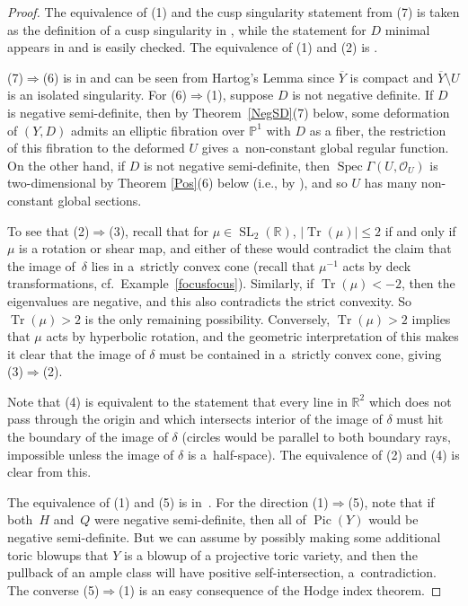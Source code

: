 \documentclass[11pt]{article}
\numberwithin{equation}{section}
\numberwithin{figure}{section}
\numberwithin{table}{section}
\DeclareMathOperator{\Pic}{Pic}
\DeclareMathOperator{\Spec}{Spec}
\DeclareMathOperator{\Tr}{Tr}
\DeclareMathOperator{\SL}{SL}
\let\?=\overline
\let\bb=\mathbb
\let\s=\mathcal
\theoremstyle{definition}
\begin{document}
\begin{proof}The equivalence of (1) and the cusp singularity statement from (7) is taken as the definition of a cusp singularity in \cite{GHK1}, while the statement for $D$ minimal appears in \cite[Example~1.10]{GHK1} and is easily checked. The equivalence of (1) and (2) is \cite[Lemma~1.5, arXiv v1]{GHK1}.

(7)$\Rightarrow$(6) is in \cite{GHK2} and can be seen from Hartog's Lemma since $\?{Y}$ is compact and $\?{Y}\setminus U$ is an isolated singularity. For (6)$\Rightarrow$(1), suppose $D$ is not negative definite. If $D$ is negative semi-definite, then by Theorem~\ref{NegSD}(7) below, some deformation of $(Y,D)$ admits an elliptic fibration over $\bb{P}^1$ with $D$ as a fiber, the restriction of this fibration to the deformed $U$ gives a~non-constant global regular function. On the other hand, if $D$ is not negative semi-definite, then $\Spec \Gamma(U,\s{O}_U)$ is two-dimensional by Theorem \ref{Pos}(6) below (i.e., by \cite[Lemma~6.9]{GHK1}), and so $U$ has many non-constant global sections.

To see that (2)$\Rightarrow$(3), recall that for $\mu \in \SL_2(\bb{R})$, $|\Tr(\mu)|\leq 2$ if and only if $\mu$ is a rotation or shear map, and either of these would contradict the claim that the image of~$\delta$ lies in a~strictly convex cone (recall that $\mu^{-1}$ acts by deck transformations, cf.\ Example~\ref{focusfocus}). Similarly, if \mbox{$\Tr(\mu)<-2$}, then the eigenvalues are negative, and this also contradicts the strict convexity. So $\Tr(\mu)>2$ is the only remaining possibility. Conversely, $\Tr(\mu)>2$ implies that $\mu$ acts by hyperbolic rotation, and the geometric interpretation of this makes it clear that the image of $\delta$ must be contained in a~strictly convex cone, giving (3)$\Rightarrow$(2).

Note that (4) is equivalent to the statement that every line in $\bb{R}^2$ which does not pass through the origin and which intersects interior of the image of $\delta$ must hit the boundary of the image of $\delta$ (circles would be parallel to both boundary rays, impossible unless the image of $\delta$ is a~half-space). The equivalence of (2) and (4) is clear from this.

The equivalence of (1) and (5) is in~\cite{GHK2}. For the direction (1)$\Rightarrow$(5), note that if both~$H$ and~$Q$ were negative semi-definite, then all of $\Pic(Y)$ would be negative semi-definite. But we can assume by possibly making some additional toric blowups that $Y$ is a blowup of a projective toric variety, and then the pullback of an ample class will have positive self-intersection, a~contradiction. The converse (5)$\Rightarrow$(1) is an easy consequence of the Hodge index theorem.
\end{proof}
\end{document}
